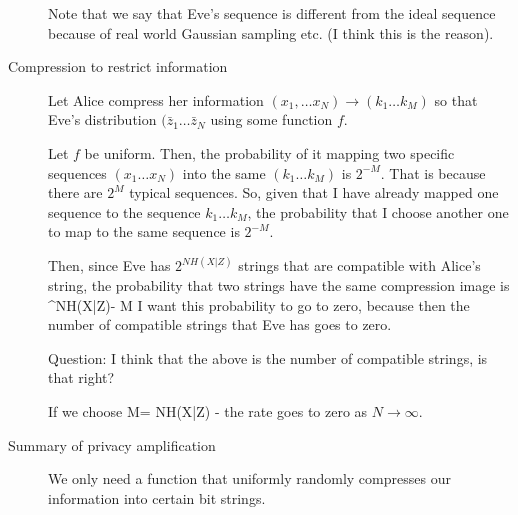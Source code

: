 \begin{description}
Note that we say that Eve's sequence is different from the ideal sequence because of real world Gaussian sampling etc. (I think this is the reason). 

\item[Compression to restrict information] Let Alice compress her information $(x_1, \ldots x_N) \rightarrow (k_1 \ldots k_M)$ so that Eve's distribution $(\bar{z}_1 \ldots \bar{z}_N$ using some function $f$. 

Let $f$ be uniform. Then, the probability of it mapping two specific sequences $(x_1 \ldots x_N)$ into the same $(k_1 \ldots k_M)$ is $2^{-M}$. That is because there are $2^M$ typical sequences. So, given that I have already mapped one sequence to the sequence $k_1 \ldots k_M$, the probability that I choose another one to map to the same sequence is $2^{-M}$. 

Then, since Eve has $2^{NH(X|Z)}$ strings that are compatible with Alice's string, the probability that two strings have the same compression image is
^{NH(X|Z)- M}
\eeq
I want this probability to go to zero, because then the number of compatible strings that Eve has goes to zero. 

Question: I think that the above is the number of compatible strings, is that right? 

If we choose
\beq
M= NH(X|Z) - 
\eeq
the rate goes to zero as $N \rightarrow \infty$. 

\item[Summary of privacy amplification] We only need a function that uniformly randomly compresses our information into certain bit strings. 

\end{description}
